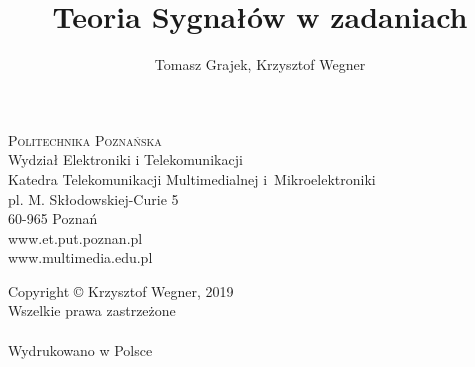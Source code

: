 \documentclass[a4paper,11pt]{LambBook} %
\def\booktitle{Teoria Sygnałów w zadaniach}
\def\bookauthors{Tomasz Grajek, Krzysztof Wegner}
\begin{document}
\title{\booktitle}
\author{\bookauthors}
\label{page:titlepage}
\makebooktitle
\thispagestyle{empty}
\begin{flushleft}
\textsc{Politechnika Poznańska}\\%
Wydział Elektroniki i Telekomunikacji\\%
Katedra Telekomunikacji Multimedialnej i~Mikroelektroniki\\[1em]

pl. M. Skłodowskiej-Curie 5\\
60-965 Poznań\\[1em]

www.et.put.poznan.pl\\
www.multimedia.edu.pl
\end{flushleft}

\vfill

\begin{flushleft}
Copyright © Krzysztof Wegner, 2019\\
Wszelkie prawa zastrzeżone\\
\ISBN\\
Wydrukowano w Polsce\\[1em]

\end{flushleft}
\clearpage
%
%
%
%
%
%
%
%
%
%
%
%
\end{document}
